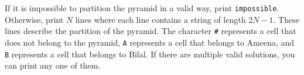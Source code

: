 
If it is impossible to partition the pyramid in a valid way, print \verb|impossible|.
Otherwise, print $N$ lines where each line contains a string of length $2N - 1$. These lines
describe the partition of the pyramid. The character \verb|#| represents a cell that does 
not belong to the pyramid, \verb|A| represents a cell that belongs to Ameena, and \verb|B|
represents a cell that belongs to Bilal. If there are multiple valid solutions, you can print 
any one of them.
